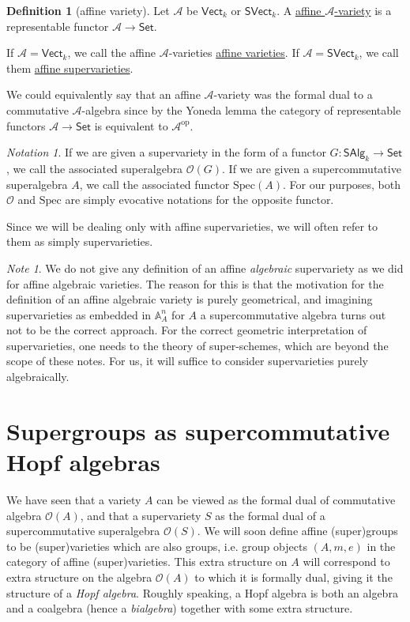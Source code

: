 \documentclass[a4paper,10pt]{scrreprt}
\newcommand{\defn}[1]{\ul{#1}}
\newcommand{\spec}{\mathrm{Spec}}
\theoremstyle{definition}
\newtheorem{definition}{Definition}[section]
\theoremstyle{plain}
\theoremstyle{remark}
\newtheorem{note}{Note}[section]
\newtheorem{notation}{Notation}[section]
\begin{document}
\begin{definition}[affine variety]
  \label{def:supervariety}
  Let $\mathscr{A}$ be $\mathsf{Vect}_{k}$ or $\mathsf{SVect}_{k}$. A \defn{affine $\mathscr{A}$-variety} is a representable functor $\mathscr{A} \to \mathsf{Set}$.

  If $\mathscr{A} = \mathsf{Vect}_{k}$, we call the affine $\mathscr{A}$-varieties \defn{affine varieties}. If $\mathscr{A} = \mathsf{SVect}_{k}$, we call them \defn{affine supervarieties}.
\end{definition}

We could equivalently say that an affine $\mathscr{A}$-variety was the formal dual to a commutative $\mathscr{A}$-algebra since by the Yoneda lemma the category of representable functors $\mathscr{A} \to \mathsf{Set}$ is equivalent to $\mathscr{A}^{\mathrm{op}}$.

\begin{notation}
  If we are given a supervariety in the form of a functor $G\colon \mathsf{SAlg}_{k} \to \mathsf{Set}$, we call the associated superalgebra $\mathscr{O}(G)$. If we are given a supercommutative superalgebra $A$, we call the associated functor $\spec(A)$. For our purposes, both $\mathscr{O}$ and $\spec$ are simply evocative notations for the opposite functor.
\end{notation}

Since we will be dealing only with affine supervarieties, we will often refer to them as simply supervarieties.

\begin{note}
  We do not give any definition of an affine \emph{algebraic} supervariety as we did for affine algebraic varieties. The reason for this is that the motivation for the definition of an affine algebraic variety is purely geometrical, and imagining supervarieties as embedded in $\mathbb{A}_{A}^{n}$ for $A$ a supercommutative algebra turns out not to be the correct approach. For the correct geometric interpretation of supervarieties, one needs to the theory of super-schemes, which are beyond the scope of these notes. For us, it will suffice to consider supervarieties purely algebraically.
\end{note}

\section{Supergroups as supercommutative Hopf algebras} \label{sec:supergroupsandsupercommutativehopfalgebras}
We have seen that a variety $A$ can be viewed as the formal dual of commutative algebra $\mathscr{O}(A)$, and that a supervariety $S$ as the formal dual of a supercommutative superalgebra $\mathscr{O}(S)$. We will soon define affine (super)groups to be (super)varieties which are also groups, i.e. group objects $(A, m, e)$ in the category of affine (super)varieties. This extra structure on $A$ will correspond to extra structure on the algebra $\mathscr{O}(A)$ to which it is formally dual, giving it the structure of a \emph{Hopf algebra}. Roughly speaking, a Hopf algebra is both an algebra and a coalgebra (hence a \emph{bialgebra}) together with some extra structure. 
\end{document}
